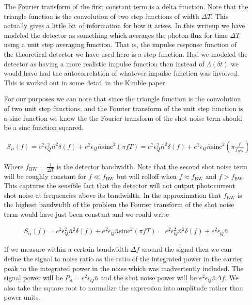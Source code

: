 \documentclass[12pt]{article}
\newcommand{\ep}{\epsilon}
\newcommand{\sinc}{\text{sinc}}
\begin{document}
The Fourier transform of the first constant term is a delta function. 
Note that the triangle function is the convolution of two step functions of width $\Delta T$. This actually gives a little bit of information for how it arises. In this writeup we have modeled the detector as something which averages the photon flux for time $\Delta T$ using a unit step averaging function. That is, the impulse response function of the theoretical detector we have used here is a step function. Had we modeled the detector as having a more realistic impulse function then instead of $\Lambda(\delta t)$ we would have had the autocorrelation of whatever impulse function was involved. This is worked out in some detail in the Kimble paper.

For our purposes we can note that since the triangle function is the convolution of two unit step functions, and the Fourier transform of the unit step function is a $\sinc$ function we know the the Fourier transform of the shot noise term should be a $\sinc$ function squared.

\begin{align}
S_{ii}(f) = e^2 \ep_Q^2 \bar{n}^2 \delta(f) + e^2 \ep_Q \bar{n} \sinc^2(\pi f T) = e^2 \ep_Q^2 \bar{n}^2 \delta(f) + e^2 \ep_Q \bar{n} \sinc^2\left(\pi \frac{f}{f_{\text{BW}}}\right)
\end{align}

Where $f_{\text{BW}} = \frac{1}{\Delta T}$ is the detector bandwidth. Note that the second shot noise term will be roughly constant for $f \ll f_{\text{BW}}$ but will rolloff when $f \approx f_{\text{BW}}$ and $f>f_{\text{BW}}$. This captures the sensible fact that the detector will not output photocurrent shot noise at frequencies above its bandwidth. In the approximation that $f_{\text{BW}}$ is the highest bandwidth of the problem the Fourier transform of the shot noise term would have just been constant and we could write

\begin{align}
S_{ii}(f) = e^2 \ep_Q^2 \bar{n}^2 \delta(f) + e^2 \ep_Q \bar{n} \sinc^2(\pi f T) = e^2 \ep_Q^2 \bar{n}^2 \delta(f) + e^2 \ep_Q \bar{n}
\end{align}

If we measure within a certain bandwidth $\Delta f$ around the signal then we can define the signal to noise ratio as the ratio of the  integrated power in the carrier peak to the integrated power in the noise which was inadvertently included. The signal power will be $P_{\text{S}} = e^2 \ep_Q \bar{n}$ and the shot noise power will be $e^2 \ep_Q \bar{n} \Delta f$. We also take the square root to normalize the expression into amplitude rather than power units.
\end{document}
